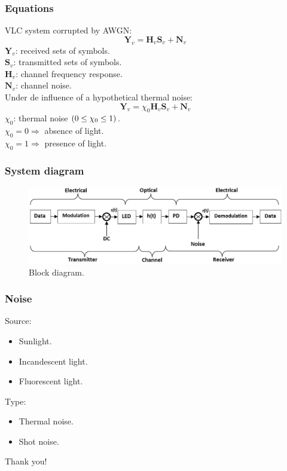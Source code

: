 \documentclass[mathserif]{beamer}
\begin{document}
\begin{frame}
\frametitle{Equations}
	VLC system corrupted by AWGN:
	\begin{equation}
		{\mathbf{Y}_v} = {\mathbf{H}_v}{\mathbf{S}_v} + {\mathbf{N}_v}
	\end{equation}
	$\mathbf{Y}_v$: received sets of symbols.\\
	$\mathbf{S}_v$: transmitted sets of symbols.\\
	$\mathbf{H}_v$: channel frequency response.\\
	$\mathbf{N}_v$: channel noise.\\
	Under de influence of a hypothetical thermal noise:
	\begin{equation}
	{\mathbf{Y}_v} = {{\chi _0}\mathbf{H}_v}{\mathbf{S}_v} + {\mathbf{N}_v}
	\end{equation}
	${\chi _0}$: thermal noise ${\rm{(0 }} \le {\rm{ }}{\chi _0}{\rm{ }} \le {\rm{ 1)}}$.\\
	 ${\chi _0} = 0 \Rightarrow$ absence of light.\\
	 ${\chi _0} = 1 \Rightarrow$ presence of light.
\end{frame}


\begin{frame}
\frametitle{System diagram}
	\begin{figure}
		\centering
		\includegraphics[width=\linewidth]{figuras/block_diagram}
		\caption{Block diagram.}
		\label{fig:block_diagram}
	\end{figure}
\end{frame}

\begin{frame}
\frametitle{Noise}
	Source:
	\begin{itemize}
		\item Sunlight.
		\item Incandescent light.
		\item Fluorescent light.
	\end{itemize}
	Type:
	\begin{itemize}
		\item Thermal noise.
		\item Shot noise.
	\end{itemize}
\end{frame}

\begin{frame}[noframenumbering]
	\vfill
	\centering
	\Huge{Thank you!}
	\vfill
\end{frame}
\end{document}
